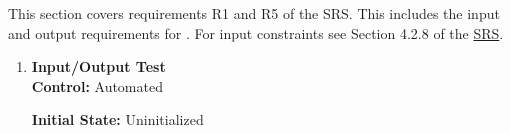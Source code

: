 \documentclass[12pt, titlepage]{article}
\newcommand{\Tthetestnum}{T\thetestnum}
\begin{document}
This section covers requirements R1 and R5 of the SRS. This includes the input and output
requirements for \progname{}. For input constraints see Section 4.2.8 of the
\href{https://github.com/adrian-soch/attitude_check/blob/main/docs/SRS/SRS.pdf}{SRS}.



\begin{enumerate}

\item[\refstepcounter{testnum} \Tthetestnum \label{t:sys_io}:] \textbf{Input/Output Test} \\


    \textbf{Control:} Automated

    \textbf{Initial State:} Uninitialized


\end{enumerate}
\end{document}
